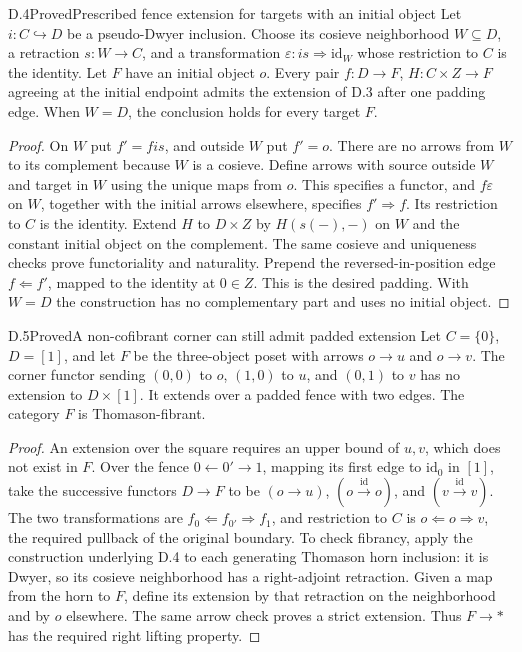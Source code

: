 \begin{claim}{D.4}{Proved}{Prescribed fence extension for targets with an initial object}
Let $i:C\hookrightarrow D$ be a pseudo-Dwyer inclusion. Choose its cosieve neighborhood $W\subseteq D$, a retraction $s:W\to C$, and a transformation $\varepsilon:is\Rightarrow\mathrm{id}_W$ whose restriction to $C$ is the identity. Let $F$ have an initial object $o$. Every pair $f:D\to F$, $H:C\times Z\to F$ agreeing at the initial endpoint admits the extension of D.3 after one padding edge. When $W=D$, the conclusion holds for every target $F$.
\end{claim}
\begin{proof}
On $W$ put $f'=fis$, and outside $W$ put $f'=o$. There are no arrows from $W$ to its complement because $W$ is a cosieve. Define arrows with source outside $W$ and target in $W$ using the unique maps from $o$. This specifies a functor, and $f\varepsilon$ on $W$, together with the initial arrows elsewhere, specifies $f'\Rightarrow f$. Its restriction to $C$ is the identity. Extend $H$ to $D\times Z$ by $H(s(-),-)$ on $W$ and the constant initial object on the complement. The same cosieve and uniqueness checks prove functoriality and naturality. Prepend the reversed-in-position edge $f\Leftarrow f'$, mapped to the identity at $0\in Z$. This is the desired padding. With $W=D$ the construction has no complementary part and uses no initial object.
\end{proof}

\begin{claim}{D.5}{Proved}{A non-cofibrant corner can still admit padded extension}
Let $C=\{0\}$, $D=[1]$, and let $F$ be the three-object poset with arrows $o\to u$ and $o\to v$. The corner functor sending $(0,0)$ to $o$, $(1,0)$ to $u$, and $(0,1)$ to $v$ has no extension to $D\times[1]$. It extends over a padded fence with two edges. The category $F$ is Thomason-fibrant.
\end{claim}
\begin{proof}
An extension over the square requires an upper bound of $u,v$, which does not exist in $F$. Over the fence $0\leftarrow0'\to1$, mapping its first edge to $\mathrm{id}_0$ in $[1]$, take the successive functors $D\to F$ to be $(o\to u)$, $(o\xrightarrow{\mathrm{id}}o)$, and $(v\xrightarrow{\mathrm{id}}v)$. The two transformations are $f_0\Leftarrow f_{0'}\Rightarrow f_1$, and restriction to $C$ is $o\Leftarrow o\Rightarrow v$, the required pullback of the original boundary.
To check fibrancy, apply the construction underlying D.4 to each generating Thomason horn inclusion: it is Dwyer, so its cosieve neighborhood has a right-adjoint retraction. Given a map from the horn to $F$, define its extension by that retraction on the neighborhood and by $o$ elsewhere. The same arrow check proves a strict extension. Thus $F\to *$ has the required right lifting property.
\end{proof}


